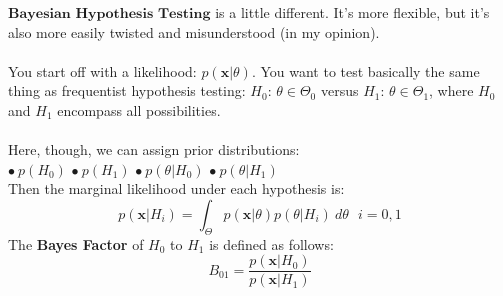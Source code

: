\documentclass[12pt]{book}
\begin{document}
$\textbf{Bayesian Hypothesis Testing}$ is a little different. It's more flexible, but it's also more easily twisted and misunderstood (in my opinion). \\\\
You start off with a likelihood: $p(\textbf{x}|\theta)$. You want to test basically the same thing as frequentist hypothesis testing: $H_0$: $\theta \in \Theta_0$ versus $H_1$: $\theta \in \Theta_1$, where $H_0$ and $H_1$ encompass all possibilities.
\\\\
Here, though, we can assign prior distributions: \\
$\bullet \ p(H_0)$ \hspace{21mm} 
$\bullet \ p(H_1)$ \hspace{21mm} 
$\bullet \ p(\theta|H_0)$  \hspace{21mm} 
$\bullet \ p(\theta|H_1)$  \hspace{21mm} 
\\
Then the marginal likelihood under each hypothesis is:
\begin{equation}
p(\textbf{x}|H_i) = \int_{\Theta} p(\textbf{x}|\theta)p(\theta|H_i) \ d\theta \ \ \ i = 0,1
\end{equation}
The \textbf{Bayes Factor} of $H_0$ to $H_1$ is defined as follows:
\begin{equation}
B_{01} = \frac{p(\textbf{x}|H_0)}{p(\textbf{x}|H_1)}
\end{equation}
\end{document}
